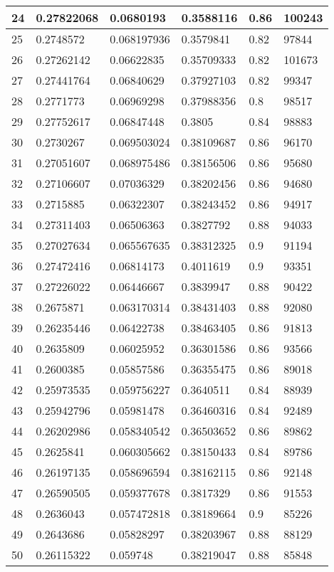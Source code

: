 \begin{longtable}{|l|l|l|l|l|l|}
24 & 0.27822068 & 0.0680193 & 0.3588116 & 0.86 & 100243 \\ \hline 
25 & 0.2748572 & 0.068197936 & 0.3579841 & 0.82 & 97844 \\ \hline 
26 & 0.27262142 & 0.06622835 & 0.35709333 & 0.82 & 101673 \\ \hline 
27 & 0.27441764 & 0.06840629 & 0.37927103 & 0.82 & 99347 \\ \hline 
28 & 0.2771773 & 0.06969298 & 0.37988356 & 0.8 & 98517 \\ \hline 
29 & 0.27752617 & 0.06847448 & 0.3805 & 0.84 & 98883 \\ \hline 
30 & 0.2730267 & 0.069503024 & 0.38109687 & 0.86 & 96170 \\ \hline 
31 & 0.27051607 & 0.068975486 & 0.38156506 & 0.86 & 95680 \\ \hline 
32 & 0.27106607 & 0.07036329 & 0.38202456 & 0.86 & 94680 \\ \hline 
33 & 0.2715885 & 0.06322307 & 0.38243452 & 0.86 & 94917 \\ \hline 
34 & 0.27311403 & 0.06506363 & 0.3827792 & 0.88 & 94033 \\ \hline 
35 & 0.27027634 & 0.065567635 & 0.38312325 & 0.9 & 91194 \\ \hline 
36 & 0.27472416 & 0.06814173 & 0.4011619 & 0.9 & 93351 \\ \hline 
37 & 0.27226022 & 0.06446667 & 0.3839947 & 0.88 & 90422 \\ \hline 
38 & 0.2675871 & 0.063170314 & 0.38431403 & 0.88 & 92080 \\ \hline 
39 & 0.26235446 & 0.06422738 & 0.38463405 & 0.86 & 91813 \\ \hline 
40 & 0.2635809 & 0.06025952 & 0.36301586 & 0.86 & 93566 \\ \hline 
41 & 0.2600385 & 0.05857586 & 0.36355475 & 0.86 & 89018 \\ \hline 
42 & 0.25973535 & 0.059756227 & 0.3640511 & 0.84 & 88939 \\ \hline 
43 & 0.25942796 & 0.05981478 & 0.36460316 & 0.84 & 92489 \\ \hline 
44 & 0.26202986 & 0.058340542 & 0.36503652 & 0.86 & 89862 \\ \hline 
45 & 0.2625841 & 0.060305662 & 0.38150433 & 0.84 & 89786 \\ \hline 
46 & 0.26197135 & 0.058696594 & 0.38162115 & 0.86 & 92148 \\ \hline 
47 & 0.26590505 & 0.059377678 & 0.3817329 & 0.86 & 91553 \\ \hline 
48 & 0.2636043 & 0.057472818 & 0.38189664 & 0.9 & 85226 \\ \hline 
49 & 0.2643686 & 0.05828297 & 0.38203967 & 0.88 & 88129 \\ \hline 
50 & 0.26115322 & 0.059748 & 0.38219047 & 0.88 & 85848 \\ \hline 
\end{longtable}